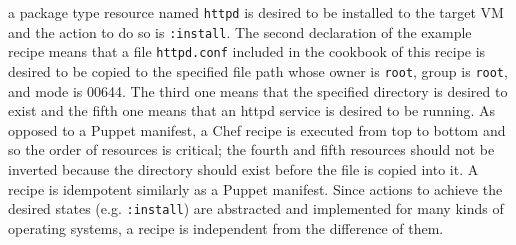 \documentclass[12pt]{report}
\begin{document}
a package type resource named {\tt httpd} is desired to be installed to
the target VM and the action to do so is {\tt :install}. The second
declaration of the example recipe means that a file {\tt httpd.conf}
included in the cookbook of this recipe is desired to be copied to the
specified file path whose owner is {\tt root}, group is {\tt root},
and mode is 00644. The third one means that the specified directory is
desired to exist and the fifth one means that an httpd service is
desired to be running. As opposed to a Puppet manifest, a Chef recipe
is executed from top to bottom and so the order of resources is
critical; the fourth and fifth resources should not be inverted
because the directory should exist before the file is copied into
it. A recipe is idempotent similarly as a Puppet manifest. Since
actions to achieve the desired states (e.g. {\tt :install}) are
abstracted and implemented for many kinds of operating systems, a
recipe is independent from the difference of them.
\end{document}

